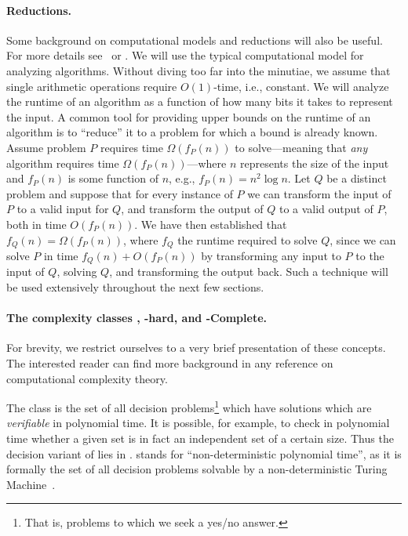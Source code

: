 \paragraph{Reductions.}
Some background on computational models and reductions will also be useful. For more details see~\cite{kleinberg2006algorithm} or \cite{knuth2011art}. We will use the typical computational model for analyzing algorithms. Without diving too far into the minutiae, we assume that single arithmetic operations require $O(1)$-time, i.e., constant. We will analyze the runtime of an algorithm as a function of how many bits it takes to represent the input. A common tool for providing upper bounds on the runtime of an algorithm is to ``reduce'' it to a problem for which a bound is already known. Assume problem $P$ requires time $\Omega(f_P(n))$ to solve---meaning that \emph{any} algorithm requires time $\Omega(f_P(n))$---where $n$ represents the size of the input and $f_P(n)$  is some function of $n$, e.g., $f_P(n) =  n^2\log n$. Let $Q$ be a distinct problem and suppose that for every instance of $P$ we can transform the input of $P$ to a valid input for $Q$, and transform the output of $Q$ to a valid output of $P$, both in time $O(f_P(n))$.  We have then established that $f_Q(n) = \Omega(f_P(n))$, where $f_Q$ the runtime required to solve $Q$, since we can solve $P$ in time $f_Q(n) + O(f_P(n))$ by transforming any input to $P$ to the input of $Q$, solving $Q$, and transforming the output back. Such a technique will be used extensively throughout the next few sections. 

\paragraph{The complexity classes \NP, \NP-hard, and \NP-Complete.}
For brevity, we restrict ourselves to a very brief presentation of these concepts. The interested reader can find more background in any reference  on computational  complexity theory. 

The class \NP  is  the set of all decision problems\footnote{That is,  problems  to which we seek a yes/no answer.} which have solutions which are \emph{verifiable} in polynomial time. It is possible, for example, to check  in polynomial time whether  a given  set is in fact an independent set of a certain size. Thus the decision variant of \iset lies in \NP. \NP stands for ``non-deterministic polynomial time'', as it is formally the set of all  decision problems solvable by a non-deterministic Turing  Machine~\cite{papadimitriou2003computational}. 

